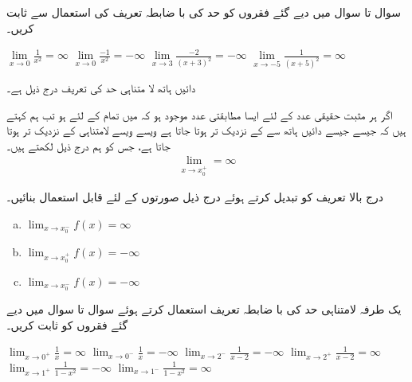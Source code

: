  سوال  تا سوال  میں دیے گئے فقروں کو حد کی با ضابطہ تعریف کی استعمال سے ثابت کریں۔

$\lim\limits_{x\to 0}\tfrac{1}{x^2}=\infty$
$\lim\limits_{x\to 0}\tfrac{-1}{x^2}=-\infty$
$\lim\limits_{x\to 3}\tfrac{-2}{(x+3)^2}=-\infty$
$\lim\limits_{x\to -5}\tfrac{1}{(x+5)^2}=\infty$

دائیں ہاتھ لا متناہی حد کی تعریف درج ذیل ہے۔

اگر ہر مثبت حقیقی عدد  کے لئے ایسا مطابقتی عدد  موجود ہو کہ  میں تمام  کے لئے  ہو تب ہم کہتے ہیں کہ جیسے جیسے  دائیں ہاتھ سے   کے نزدیک تر ہوتا جاتا ہے ویسے ویسے  لامتناہی کے نزدیک تر ہوتا جاتا ہے، جس کو ہم درج ذیل لکھتے ہیں۔
\begin{align*}
\lim_{x\to x_0^+}=\infty
\end{align*}

درج بالا تعریف کو تبدیل کرتے ہوئے درج ذیل صورتوں کے لئے قابل استعمال بنائیں۔
\begin{multicols}{2}
\begin{enumerate}[a.]
\item
$\lim_{x\to x_0^-}f(x)=\infty$
\item
$\lim_{x\to x_0^+}f(x)=-\infty$
\item
$\lim_{x\to x_0^-}f(x)=-\infty$
\end{enumerate}
\end{multicols}

یک طرفہ لامتناہی حد کی با ضابطہ تعریف استعمال کرتے ہوئے سوال  تا سوال  میں دیے گئے فقروں کو ثابت کریں۔ 

$\lim_{x\to 0^+}\tfrac{1}{x}=\infty$
$\lim_{x\to 0^-}\tfrac{1}{x}=-\infty$
$\lim_{x\to 2^-}\tfrac{1}{x-2}=-\infty$
$\lim_{x\to 2^+}\tfrac{1}{x-2}=\infty$
$\lim_{x\to 1^+}\tfrac{1}{1-x^2}=-\infty$
$\lim_{x\to 1^-}\tfrac{1}{1-x^2}=\infty$

